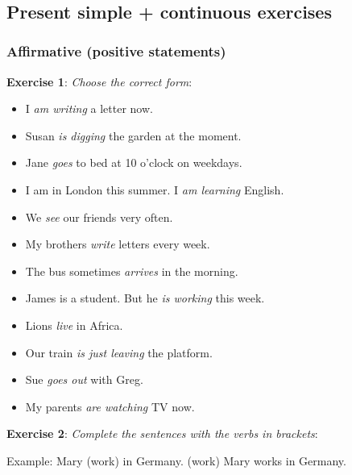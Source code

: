 \


\subsection{Present simple + continuous exercises}

\subsubsection{Affirmative (positive statements)}

\textbf{Exercise 1}: \textit{Choose the correct form}:

\begin{itemize}

\item I \textit{am writing} a letter now.
\item Susan \textit{is digging} the garden at the moment.
\item Jane \textit{goes} to bed at 10 o'clock on weekdays.
\item I am in London this summer. I \textit{am learning} English.
\item We \textit{see} our friends very often.
\item My brothers \textit{write} letters every week.
\item The bus sometimes \textit{arrives} in the morning.
\item James is a student. But he \textit{is working} this week.
\item Lions \textit{live} in Africa.
\item Our train \textit{is just leaving} the platform.
\item Sue \textit{goes out} with Greg.
\item My parents \textit{are watching} TV now.

\end{itemize}

\textbf{Exercise 2}: \textit{Complete the sentences with the verbs in brackets}:

Example:
Mary (work) in Germany. (work)               
Mary works in Germany.

